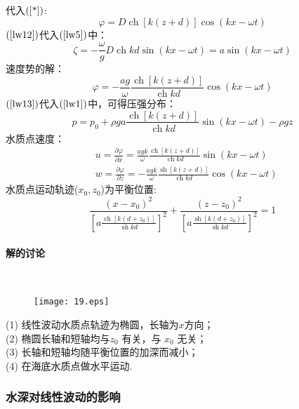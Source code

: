 \documentclass[a4paper,12pt]{article}
\begin{document}
    代入$(\ref{*})$:
    \begin{equation}
        \varphi=D\operatorname{ch}[k(z+d)]\cos (kx-\omega t) \label{lw12}
    \end{equation}
    $(\ref{lw12})$代入$(\ref{lw5})$中：
    \[
        \zeta=-\frac{\omega}{g} D \operatorname{ch} k d  \sin (k x-\omega t)=a\sin (kx-\omega t)
    \]
    速度势的解：
    \begin{equation}
        \varphi=-\frac{a g}{\omega} \frac{\operatorname{ch}[k(z+d)]}{\operatorname{ch} k d} \cos (k x-\omega t) \label{lw13}
    \end{equation}
    $(\ref{lw13})$代入$(\ref{lw1})$中，可得压强分布：
    \[
        p=p_{0}+\rho g a \frac{\operatorname{ch}[k(z+d)]}{\operatorname{ch} k d} \sin (k x-\omega t)-\rho g z
    \]
    水质点速度：
    \[
        \begin{aligned}
            &u=\frac{\partial \varphi}{\partial x}=\frac{a g k}{\omega} \frac{\operatorname{ch}[k(z+d)]}{\operatorname{ch} k d} \sin (k x-\omega t) \\
            &w=\frac{\partial \varphi}{\partial z}=-\frac{{agk}}{\omega} \frac{\operatorname{sh}[k(z+d)]}{\operatorname{ch} k d} \cos (k x-\omega t)
            \end{aligned}
    \]
    水质点运动轨迹($x_0,z_0$)为平衡位置:
    \[
        \frac{\left(x-x_{0}\right)^{2}}{\left[a \frac{\operatorname{ch}\left[k\left(d+z_{0}\right)\right]}{\operatorname{sh} k d}\right]^{2}}+\frac{\left(z-z_{0}\right)^{2}}{\left[a \frac{\operatorname{sh}\left[k\left(d+z_{0}\right)\right]}{\operatorname{sh} k d}\right]^{2}}=1
    \]
    \paragraph{解的讨论}~{}
    \begin{figure}[H]
        \centering \texttt{[image: 19.eps]}
        \caption*{}
    \end{figure}
    (1) 线性波动水质点轨迹为椭圆，长轴为$x$方向；\\
    (2) 椭圆长轴和短轴均与$z_0$ 有关，与 $x_0$ 无关；\\  
    (3) 长轴和短轴均随平衡位置的加深而减小；\\
    (4) 在海底水质点做水平运动.
    \subsubsection{水深对线性波动的影响}
\end{document}
